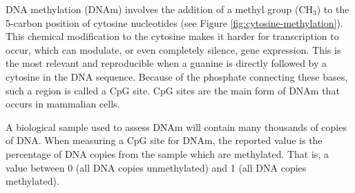\documentclass{article} %
\begin{document}
DNA methylation (DNAm) involves the addition of a methyl group (CH\(_3\)) to the 5-carbon position of cytosine nucleotides (see Figure \ref{fig:cytosine-methylation}). This chemical modification to the cytosine makes it harder for transcription to occur, which can modulate, or even completely silence, gene expression. This is the most relevant and reproducible when a guanine is directly followed by a cytosine in the DNA sequence. Because of the phosphate connecting these bases, such a region is called a CpG site. CpG sites are the main form of DNAm that occurs in mammalian cells.

A biological sample used to assess DNAm will contain many thousands of copies of DNA. When measuring a CpG site for DNAm, the reported value is the percentage of DNA copies from the sample which are methylated. That is, a value between 0 (all DNA copies unmethylated) and 1 (all DNA copies methylated).

\end{document}

